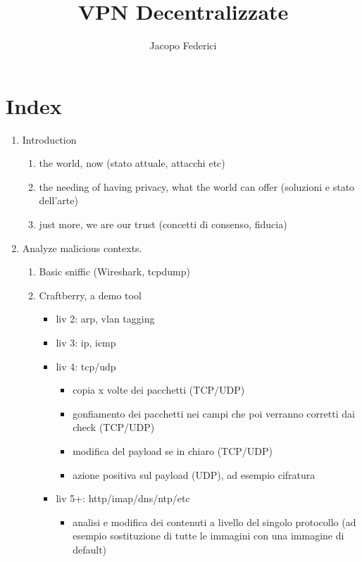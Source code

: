 \documentclass[]{article}
\title{VPN Decentralizzate}
\author{Jacopo Federici}
\begin{document}
	
	\maketitle
	
	\begin{abstract}
		
	\end{abstract}
	
	\section{Index}
	
	\begin{enumerate}
			\item Introduction
				\begin{enumerate}
					\item the world, now (stato attuale, attacchi etc)
					\item the needing of having privacy, what the world can offer (soluzioni e stato dell'arte)
					\item just more, we are our trust (concetti di consenso, fiducia)
				\end{enumerate}
			\item Analyze malicious contexts.
				\begin{enumerate}
					\item Basic sniffic (Wireshark, tcpdump)
					\item Craftberry, a demo tool
					\begin{itemize}
						\item liv 2: arp, vlan tagging
						\item liv 3: ip, icmp
						\item liv 4: tcp/udp
						\begin{itemize}
							\item copia x volte dei pacchetti (TCP/UDP)
							\item gonfiamento dei pacchetti nei campi che poi verranno corretti dai check (TCP/UDP)
							\item modifica del payload se in chiaro (TCP/UDP)
							\item azione positiva sul payload (UDP), ad esempio cifratura
						\end{itemize}
						\item liv 5+: http/imap/dns/ntp/etc
						\begin{itemize}
							\item analisi e modifica dei contenuti a livello del singolo protocollo (ad esempio sostituzione di tutte le immagini con una immagine di default)

\end{itemize}
\end{itemize}
\end{enumerate}
\end{enumerate}
\end{document}
